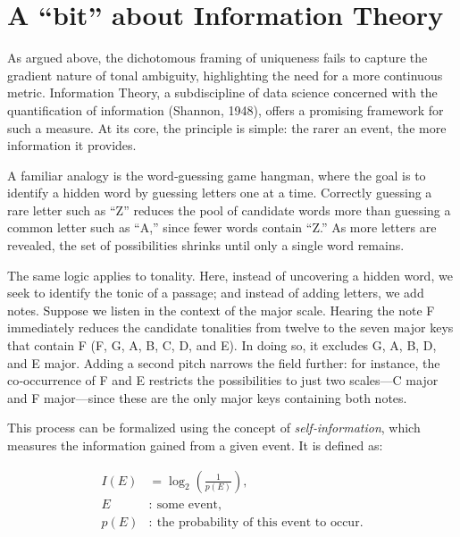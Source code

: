 \documentclass[10pt,twocolumn]{article}
\numberwithin{equation}{section} %
\begin{document}
\section{A “bit” about Information Theory}

As argued
above, the dichotomous framing of uniqueness fails to capture the gradient
nature of tonal ambiguity, highlighting the need for a more continuous metric.
Information Theory, a subdiscipline of data science concerned with the
quantification of information (Shannon,
1948), offers a promising framework for such
a measure. At its core, the principle is simple: the rarer an event, the more
information it provides.

A familiar
analogy is the word‑guessing game hangman, where the goal is to identify a hidden word
by guessing letters one at a time. Correctly guessing a rare letter such as “Z”
reduces the pool of candidate words more than guessing a common letter such as
“A,” since fewer words contain “Z.” As more letters are revealed, the set of
possibilities shrinks until only a single word remains.

The same logic
applies to tonality. Here, instead of uncovering a hidden word, we seek to
identify the tonic of a passage; and instead of adding letters, we add notes.
Suppose we listen in the context of the major scale. Hearing the note F
immediately reduces the candidate tonalities from twelve to the seven major
keys that contain F (F, G\text{$\flat$}, A\text{$\flat$}, B\text{$\flat$}, C, D\text{$\flat$}, and E\text{$\flat$}). In doing so, it excludes G, A, B, D, and E major. Adding a second
pitch narrows the field further: for instance, the co‑occurrence of F and E restricts the
possibilities to just two scales—C major and F major—since these are the only
major keys containing both notes.

This process
can be formalized using the concept of \textit{self}\textit{‑}\textit{information}, which measures the information gained
from a given event. It is defined as:

\begin{align}
I(E) &= \log_{2} \left( \frac{1}{p(E)} \right), \\
E &:\ \text{some event}, \\
p(E) &:\ \text{the probability of this event to occur}.
\end{align}

\end{document}
